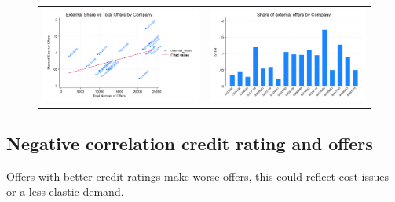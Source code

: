 \documentclass[12pt]{article}
\begin{document}
\begin{figure}[H]
\caption{}
 \label{fig:ie4_2and3}
\centering{}%
\begin{tabular}{cc}
\includegraphics[scale=0.17]{figures/IE4/IE4_total_internal_offers_bycompany.png} & \includegraphics[scale=0.17]{figures/IE4/IE4_variation_share_external.png}
\end{tabular}
\end{figure} 

\newpage

\subsection{Negative correlation credit rating and offers}

Offers with better credit ratings make worse offers, this could reflect cost issues or a less elastic demand. 
\end{document}
